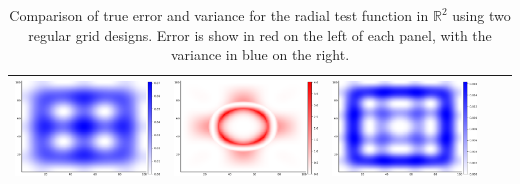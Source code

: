 \documentclass{article}
\newcommand{\R}{\mathbb{R}}
\numberwithin{equation}{section}
\begin{document}
\begin{table}
\begin{tabularx}{\textwidth}{| X | p{} p{} || p{} p{} |}
      \parbox[c]{.18\textwidth}{\includegraphics[scale=0.2]{figures/heatmaps/variance-noisy-16.png}} &
      \parbox[c]{.18\textwidth}{\includegraphics[scale=0.2]{figures/heatmaps/error-noisy-25.png}} &
      \parbox[c]{.18\textwidth}{\includegraphics[scale=0.2]{figures/heatmaps/variance-noisy-25.png}} \\
    \hline
  \end{tabularx}
  \caption{Comparison of true error and variance for the radial test function in $\R^2$ using two regular grid designs. Error is show in red on the left of each panel, with the variance in blue on the right.}
  \label{variance}
\end{table}
\end{document}
